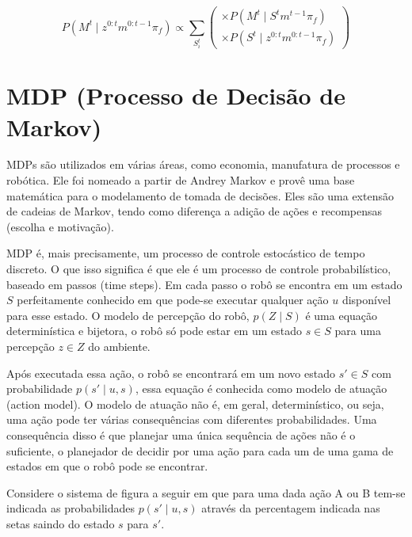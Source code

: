 \begin{equation}
    P \left( M^t \mid z^{0: t} m^{0: t-1} \pi_f \right) \propto \sum\limits_{S_i^t}
        \left(
            \begin{array}{l}
                \times P \left( M^t \mid S^t m^{t-1} \pi_f \right)\\
                \times P \left( S^t \mid z^{0: t} m^{0: t-1} \pi_f \right)
            \end{array}
        \right)
\end{equation}


\section{MDP (Processo de Decisão de Markov)} \label{section:MDP}

MDPs são utilizados em várias áreas, como economia, manufatura de processos e robótica. Ele foi nomeado a partir de Andrey Markov e provê uma base matemática para o modelamento de tomada de decisões. Eles são uma extensão de cadeias de Markov, tendo como diferença a adição de ações e recompensas (escolha e motivação).

MDP é, mais precisamente, um processo de controle estocástico de tempo discreto. O que isso significa é que ele é um processo de controle probabilístico, baseado em passos (time steps). Em cada passo o robô se encontra em um estado $ S $ perfeitamente conhecido em que pode-se executar qualquer ação $ u $ disponível para esse estado. O modelo de percepção do robô, $ p \left( Z \mid S \right) $ é uma equação determinística e bijetora, o robô só pode estar em um estado $ s \in S $ para uma percepção $ z \in Z $ do ambiente.

Após executada essa ação, o robô se encontrará em um novo estado $ s' \in S $ com probabilidade $ p \left( s' \mid u, s \right) $, essa equação é conhecida como modelo de atuação (action model). O modelo de atuação não é, em geral, determinístico, ou seja, uma ação pode ter várias consequências com diferentes probabilidades. Uma consequência disso é que planejar uma única sequência de ações não é o suficiente, o planejador de decidir por uma ação para cada um de uma gama de estados em que o robô pode se encontrar.

Considere o sistema de figura a seguir em que para uma dada ação A ou B tem-se indicada as probabilidades $ p \left( s' \mid u, s \right) $ através da percentagem indicada nas setas saindo do estado $ s $ para $ s' $.


